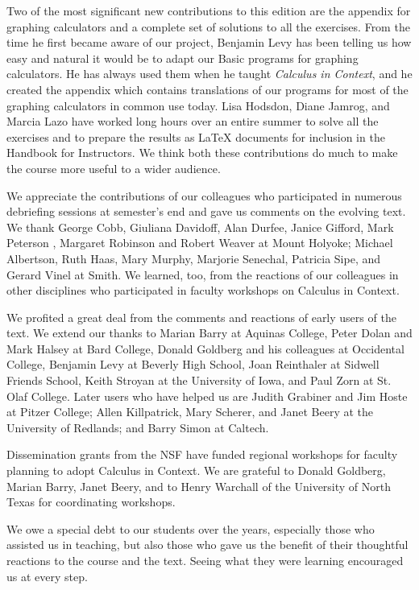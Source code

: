 Two of the most significant new contributions to this edition are the
appendix for graphing calculators and a complete set of solutions to
all the exercises.  From the time he first became aware of our
project, Benjamin Levy has been telling us how easy and natural it
would be to adapt our Basic programs for graphing calculators.  He has
always used them when he taught {\em Calculus in Context}, and he
created the appendix which contains translations of our programs for
most of the graphing calculators in common use today.  Lisa Hodsdon,
Diane Jamrog, and Marcia Lazo have worked long hours over an entire
summer to solve all the exercises and to prepare the results as
\LaTeX{} documents for inclusion in the Handbook for Instructors.  We
think both these contributions do much to make the course more useful
to a wider audience.

We appreciate the contributions of our colleagues who participated in
numerous debriefing sessions at semester's end and gave us comments on
the evolving text.  We thank George Cobb, Giuliana Davidoff, Alan
Durfee, Janice Gifford, Mark Peterson , Margaret Robinson and Robert
Weaver at Mount Holyoke; Michael Albertson, Ruth Haas, Mary Murphy,
Marjorie Senechal, Patricia Sipe, and Gerard Vinel at Smith.  We
learned, too, from the reactions of our colleagues in other
disciplines who participated in faculty workshops on Calculus in
Context.

We profited a great deal from the comments and reactions of early
users of the text.  We extend our thanks to Marian Barry at Aquinas
College, Peter Dolan and Mark Halsey at Bard College, Donald Goldberg
and his colleagues at Occidental College, Benjamin Levy at Beverly
High School, Joan Reinthaler at Sidwell Friends School, Keith Stroyan
at the University of Iowa, and Paul Zorn at St. Olaf College.  Later
users who have helped us are Judith Grabiner and Jim Hoste at Pitzer
College; Allen Killpatrick, Mary Scherer, and Janet Beery at the
University of Redlands; and Barry Simon at Caltech.

Dissemination grants from the NSF have funded regional workshops for
faculty planning to adopt Calculus in Context.  We are grateful to
Donald Goldberg, Marian Barry, Janet Beery, and to Henry Warchall of
the University of North Texas for coordinating workshops.

We owe a special debt to our students over the years, especially those
who assisted us in teaching, but also those who gave us the benefit of
their thoughtful reactions to the course and the text.  Seeing what
they were learning encouraged us at every step.

